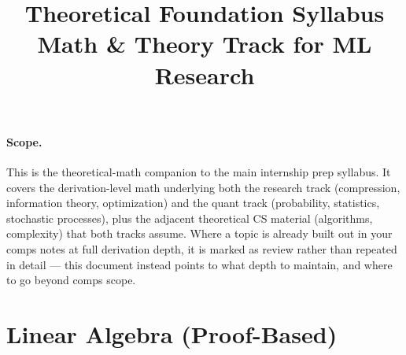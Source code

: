 

\titleformat{\section}{\Large\bfseries}{\thesection}{0.6em}{}
\titleformat{\subsection}{\large\bfseries}{\thesubsection}{0.6em}{}


\newcommand{\review}{\textit{(review — already covered in comps notes)}}
\newcommand{\note}[1]{\textcolor{gray!70!black}{\small #1}}

\title{\textbf{Theoretical Foundation Syllabus} \\[4pt]
\large Math \& Theory Track for ML Research }
\author{}
\date{}




\maketitle
\vspace{-2em}

\paragraph{Scope.} This is the theoretical-math companion to the main internship prep syllabus. It covers the derivation-level math underlying both the research track (compression, information theory, optimization) and the quant track (probability, statistics, stochastic processes), plus the adjacent theoretical CS material (algorithms, complexity) that both tracks assume. Where a topic is already built out in your comps notes at full derivation depth, it is marked as review rather than repeated in detail — this document instead points to what depth to maintain, and where to go beyond comps scope.

\tableofcontents
\vspace{1em}

\section{Linear Algebra (Proof-Based)}

